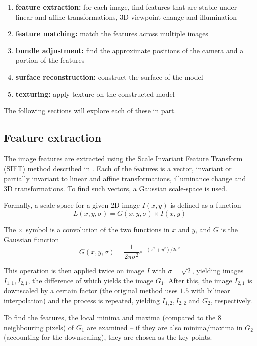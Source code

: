 \begin{enumerate}
	\item \textbf{feature extraction:} for each image, find features that are stable under linear and affine transformations, 3D viewpoint change and illumination
	\item \textbf{feature matching:} match the features across multiple images
	\item \textbf{bundle adjustment:} find the approximate positions of the camera and a portion of the features
	\item \textbf{surface reconstruction:} construct the surface of the model
	\item \textbf{texturing:} apply texture on the constructed model
\end{enumerate}

The following sections will explore each of these in part.

\subsection{Feature extraction}
The image features are extracted using the Scale Invariant Feature Transform (SIFT) method described in \citet{lowe1999object,lowe2004distinctive,snavely2008modeling}.
Each of the features is a vector, invariant or partially invariant to linear and affine transformations, illuminance change and 3D transformations.
To find such vectors, a Gaussian scale-space is used.

Formally, a scale-space for a given 2D image $I(x, y)$ is defined as a function
$$L(x, y, \sigma) = G(x, y, \sigma) \times I(x, y)$$

The $\times$ symbol is a convolution of the two functions in $x$ and $y$, and $G$ is the Gaussian function
$$G(x, y, \sigma) = \frac{1}{2\pi \sigma^2} e^{-(x^2 + y^2) / 2\sigma^2}$$

This operation is then applied twice on image $I$ with $\sigma = \sqrt{2}$, yielding images $I_{1,1}, I_{2,1}$, the difference of which yields the image $G_1$.
After this, the image $I_{2,1}$ is downscaled by a certain factor (the original method uses $1.5$ with bilinear interpolation) and the process is repeated, yielding $I_{1,2}, I_{2,2}$ and $G_2$, respectively.

To find the features, the local minima and maxima (compared to the 8 neighbouring pixels) of $G_1$ are examined -- if they are also minima/maxima in $G_2$ (accounting for the downscaling), they are chosen as the key points.

